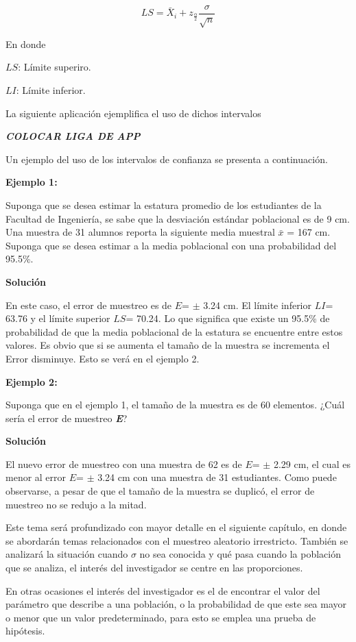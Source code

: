 \documentclass[
  oneside]{book}
\begin{document}
\begin{equation}
LS=\bar{X}_i+z_{\frac{\alpha}{2}}\frac{\sigma}{\sqrt{n}}
\end{equation}

En donde

\(LS\): Límite superiro.

\(LI\): Límite inferior.

La siguiente aplicación ejemplifica el uso de dichos intervalos

\textbf{\emph{COLOCAR LIGA DE APP}}

Un ejemplo del uso de los intervalos de confianza se presenta a continuación.

\textbf{Ejemplo 1:}

Suponga que se desea estimar la estatura promedio de los estudiantes de la Facultad de Ingeniería, se sabe que la desviación estándar poblacional es de 9 cm. Una muestra de 31 alumnos reporta la siguiente media muestral \(\bar{x}\) = 167 cm. Suponga que se desea estimar a la media poblacional con una probabilidad del 95.5\%.

\textbf{Solución}

En este caso, el error de muestreo es de \(E\)= \(\pm\) 3.24 cm. El límite inferior \(LI\)= 63.76 y el límite superior \(LS\)= 70.24. Lo que significa que existe un 95.5\% de probabilidad de que la media poblacional de la estatura se encuentre entre estos valores. Es obvio que si se aumenta el tamaño de la muestra se incrementa el Error disminuye. Esto se verá en el ejemplo 2.

\textbf{Ejemplo 2:}

Suponga que en el ejemplo 1, el tamaño de la muestra es de 60 elementos. ¿Cuál sería el error de muestreo \textbf{\emph{E}}?

\textbf{Solución}

El nuevo error de muestreo con una muestra de 62 es de \(E\)= \(\pm\) 2.29 cm, el cual es menor al error \(E\)= \(\pm\) 3.24 cm con una muestra de 31 estudiantes. Como puede observarse, a pesar de que el tamaño de la muestra se duplicó, el error de muestreo no se redujo a la mitad.

Este tema será profundizado con mayor detalle en el siguiente capítulo, en donde se abordarán temas relacionados con el muestreo aleatorio irrestricto. También se analizará la situación cuando \(\sigma\) no sea conocida y qué pasa cuando la población que se analiza, el interés del investigador se centre en las proporciones.

En otras ocasiones el interés del investigador es el de encontrar el valor del parámetro que describe a una población, o la probabilidad de que este sea mayor o menor que un valor predeterminado, para esto se emplea una prueba de hipótesis.
\end{document}
